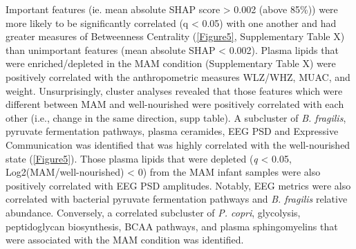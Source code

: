 \documentclass{article}
\begin{document}
Important features (ie. mean absolute \gls{SHAP} score \textgreater{} 0.002 (above 85\%)) were more likely to be significantly correlated (q \textless{} 0.05) with one another and had greater measures of Betweenness Centrality (\autoref{Figure5}, Supplementary Table X) than unimportant features (mean absolute \gls{SHAP} \textless{} 0.002).
Plasma lipids that were enriched/depleted in the \gls{MAM} condition (Supplementary Table X) were positively correlated with the anthropometric measures \gls{WLZ/WHZ}, \gls{MUAC}, and weight.
Unsurprisingly, cluster analyses revealed that those features which were different between \gls{MAM} and well-nourished were positively correlated with each other (i.e., change in the same direction, supp table).
A subcluster of \textit{B. fragilis}, pyruvate fermentation pathways, plasma ceramides, EEG PSD and Expressive Communication was identified that was highly correlated with the well-nourished state (\autoref{Figure5}).
Those plasma lipids that were depleted (\textit{q} \textless{} 0.05, Log2(\gls{MAM}/well-nourished) \textless{} 0) from the \gls{MAM} infant samples were also positively correlated with EEG PSD amplitudes.
Notably, EEG metrics were also correlated with bacterial pyruvate fermentation pathways and \textit{B. fragilis} relative abundance.
Conversely, a correlated subcluster of \textit{P. copri}, glycolysis, peptidoglycan biosynthesis, BCAA pathways, and plasma sphingomyelins that were associated with the \gls{MAM} condition was identified. 
\end{document}

